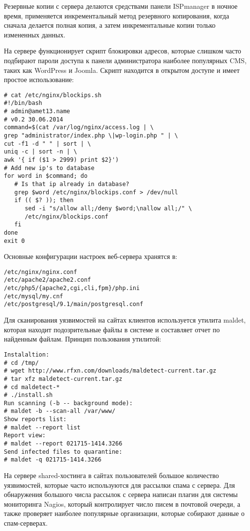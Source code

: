 Резервные копии с сервера делаются средствами панели ISPmanager в ночное время, применяется инкрементальный метод резервного копирования, когда сначала делается полная копия, а затем инкрементальные копии только измененных данных.

На сервере функционирует скрипт блокировки адресов, которые слишком часто подбирают пароли доступа к панели администратора наиболее популярных CMS, таких как WordPress и Joomla.
Скрипт находится в открытом доступе и имеет простое использование:
\begin{lstlisting}
# cat /etc/nginx/blockips.sh
#!/bin/bash
# admin@amet13.name
# v0.2 30.06.2014
command=$(cat /var/log/nginx/access.log | \
grep "administrator/index.php \|wp-login.php " | \
cut -f1 -d " " | sort | \
uniq -c | sort -n | \
awk '{ if ($1 > 2999) print $2}')
# Add new ip's to database
for word in $command; do
   # Is that ip already in database?
   grep $word /etc/nginx/blockips.conf > /dev/null
   if (( $? )); then 
      sed -i "s/allow all;/deny $word;\nallow all;/" \
      /etc/nginx/blockips.conf
   fi
done
exit 0
\end{lstlisting}

Основные конфигурации настроек веб-сервера хранятся в:
\begin{lstlisting}
/etc/nginx/nginx.conf
/etc/apache2/apache2.conf
/etc/php5/{apache2,cgi,cli,fpm}/php.ini
/etc/mysql/my.cnf
/etc/postgresql/9.1/main/postgresql.conf
\end{lstlisting}

Для сканирования уязвимостей на сайтах клиентов используется утилита maldet, которая находит подозрительные файлы в системе и составляет отчет по найденным файлам.
Принцип пользования утилитой:
\begin{lstlisting}
Instalaltion:
# cd /tmp/
# wget http://www.rfxn.com/downloads/maldetect-current.tar.gz
# tar xfz maldetect-current.tar.gz
# cd maldetect-*
# ./install.sh
Run scanning (-b -- background mode):
# maldet -b --scan-all /var/www/
Show reports list:
# maldet --report list
Report view:
# maldet --report 021715-1414.3266
Send infected files to quarantine:
# maldet -q 021715-1414.3266
\end{lstlisting}

На сервере shared-хостинга в сайтах пользователей большое количество уязвимостей, которые часто используются для рассылки спама с сервера.
Для обнаружения большого числа рассылок с сервера написан плагин для системы мониторинга Nagios, который контролирует число писем в почтовой очереди, а также проверяет наиболее популярные организации, которые собирают данные о спам-серверах.

